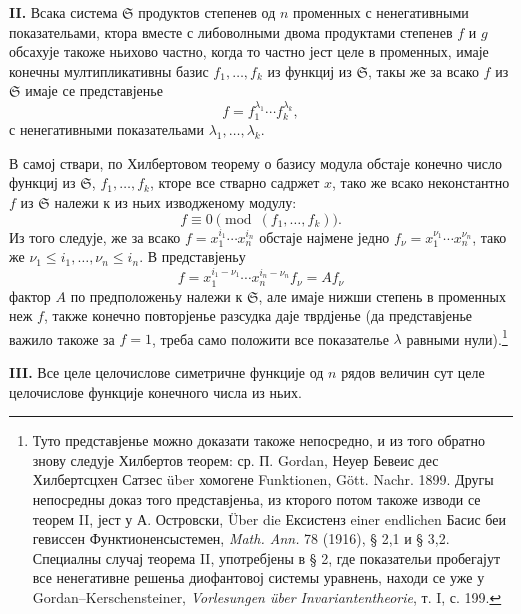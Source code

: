 ﻿\documentclass[11pt]{article}
\providecommand{\frS}{\mathfrak S}
\begin{document}
\textbf{II.} Всака система \(\frS\) продуктов степенев од \(n\) променных с ненегативными показательами, ктора вместе с либоволными двома продуктами степенев \(f\) и \(g\) обсахује такоже ньихово частно, когда то частно јест целе в променных, имаје конечны мултипликативны базис \(f_1,\ldots,f_k\) из функциј из \(\frS\), такы же за всако \(f\) из \(\frS\) имаје се представјенье
\[
        f=f_1^{\lambda_1}\cdots f_k^{\lambda_k},
\]
с ненегативными показательами \(\lambda_1,\ldots,\lambda_k\).

В самој ствари, по Хилбертовом теорему о базису модула обстаје конечно число функциј из \(\frS\), \(f_1,\ldots,f_k\), кторе все стварно садржет \(x\), тако же всако неконстантно \(f\) из \(\frS\) належи к из ньих изводженому модулу:
\[
        f\equiv0\pmod{(f_1,\ldots,f_k)}.
\]
Из того следује, же за всако \(f=x_1^{i_1}\cdots x_n^{i_n}\) обстаје најмене једно \(f_\nu=x_1^{\nu_1}\cdots x_n^{\nu_n}\), тако же \(\nu_1\le i_1,\ldots,\nu_n\le i_n\). В представјеньу
\[
        f=x_1^{i_1-\nu_1}\cdots x_n^{i_n-\nu_n} f_\nu = A f_\nu
\]
фактор \(A\) по предположеньу належи к \(\frS\), але имаје нижши степень в променных неж \(f\), также конечно повторјенье разсудка даје тврдјенье (да представјенье важило такоже за \(f=1\), треба само положити все показателье \(\lambda\) равными нули).\footnote{Туто представјенье можно доказати такоже непосредно, и из того обратно знову следује Хилбертов теорем: ср. П. Gordan, Неуер Бевеис дес Хилбертсцхен Сатзес über хомогене Funktionen, Gött. Nachr. 1899. Другы непосредны доказ того представјеньа, из кторого потом такоже изводи се теорем II, јест у А. Островски, Über die Ексистенз einer endlichen Басис беи гевиссен Функтионенсыстемен, \emph{Math. Ann.} 78 (1916), § 2,1 и § 3,2. Специалны случај теорема II, употребјены в § 2, где показательи пробегајут все ненегативне решеньа диофантовој системы уравнень, находи се уже у Gordan--Kerschensteiner, \emph{Vorlesungen über Invariantentheorie}, т. I, с. 199.}

\textbf{III.} Все целе целочислове симетричне функције од \(n\) рядов величин сут целе целочислове функције конечного числа из ньих.
\end{document}

